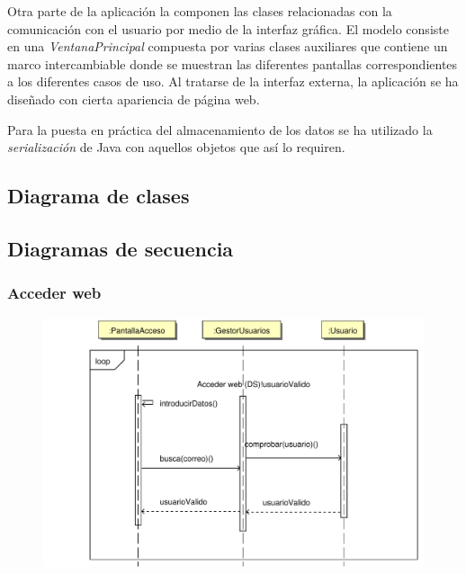 \documentclass[11pt, a4paper, twoside, titlepage]{article}
\begin{document}
			Otra parte de la aplicación la componen las clases relacionadas con la comunicación con el usuario por medio de la interfaz gráfica. El modelo consiste en una \textit{VentanaPrincipal} compuesta por varias clases auxiliares que contiene un marco intercambiable donde se muestran las diferentes pantallas correspondientes a los diferentes casos de uso. Al tratarse de la interfaz externa, la aplicación se ha diseñado con cierta apariencia de página web.

			Para la puesta en práctica del almacenamiento de los datos se ha utilizado la \textit{serialización} de Java con aquellos objetos que así lo requiren.
			

		\subsection{Diagrama de clases}

			\begin{figure}[H]\centering
				\vspace{2cm}
				\hspace{-2cm}
			\end{figure}

		\subsection{Diagramas de secuencia}

			\subsubsection{Acceder web}
				\begin{figure}[H]\centering
					\includegraphics[scale=.7]{diagramas/accederweb.pdf}
				\end{figure}
\end{document}
